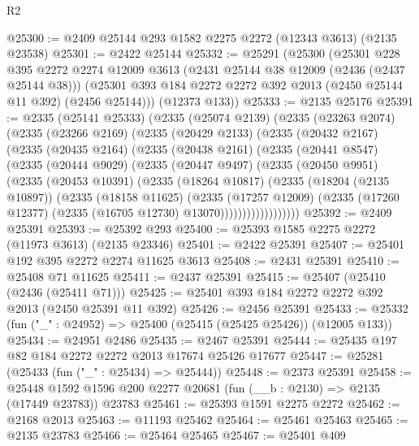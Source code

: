 \begin{lexlean}{R2}
\begin{coremodule}
@25300 := @2409 @25144 @293 @1582 @2275 @2272 (@12343 @3613) (@2135 @23538)
@25301 := @2422 @25144
@25332 := @25291
    (@25300
      (@25301
        @228
        @395
        @2272
        @2274
        @12009
        @3613
        (@2431 @25144 @38 @12009 (@2436 (@2437 @25144 @38)))
        (@25301 @393 @184 @2272 @2272 @392 @2013 (@2450 @25144 @11 @392) (@2456 @25144)))
      (@12373 @133))
@25333 := @2135 @25176
@25391 := @2335
    (@25141 @25333)
    (@2335
      (@25074 @2139)
      (@2335
        (@23263 @2074)
        (@2335
          (@23266 @2169)
          (@2335
            (@20429 @2133)
            (@2335
              (@20432 @2167)
              (@2335
                (@20435 @2164)
                (@2335
                  (@20438 @2161)
                  (@2335
                    (@20441 @8547)
                    (@2335
                      (@20444 @9029)
                      (@2335
                        (@20447 @9497)
                        (@2335
                          (@20450 @9951)
                          (@2335
                            (@20453 @10391)
                            (@2335
                              (@18264 @10817)
                              (@2335
                                (@18204 (@2135 @10897))
                                (@2335
                                  (@18158 @11625)
                                  (@2335
                                    (@17257 @12009)
                                    (@2335
                                      (@17260 @12377)
                                      (@2335 (@16705 @12730) @13070))))))))))))))))))
@25392 := @2409 @25391
@25393 := @25392 @293
@25400 := @25393 @1585 @2275 @2272 (@11973 @3613) (@2135 @23346)
@25401 := @2422 @25391
@25407 := @25401 @192 @395 @2272 @2274 @11625 @3613
@25408 := @2431 @25391
@25410 := @25408 @71 @11625
@25411 := @2437 @25391
@25415 := @25407 (@25410 (@2436 (@25411 @71)))
@25425 := @25401 @393 @184 @2272 @2272 @392 @2013 (@2450 @25391 @11 @392)
@25426 := @2456 @25391
@25433 := @25332 (fun ("_" : @24952) => @25400 (@25415 (@25425 @25426)) (@12005 @133))
@25434 := @24951 @2486
@25435 := @2467 @25391
@25444 := @25435 @197 @82 @184 @2272 @2272 @2013 @17674 @25426 @17677
@25447 := @25281 (@25433 (fun ("_" : @25434) => @25444))
@25448 := @2373 @25391
@25458 := @25448 @1592 @1596 @200 @2277 @20681 (fun (__b : @2130) => @2135 (@17449 @23783)) @23783
@25461 := @25393 @1591 @2275 @2272
@25462 := @2168 @2013
@25463 := @11193 @25462
@25464 := @25461 @25463
@25465 := @2135 @23783
@25466 := @25464 @25465
@25467 := @25401 @409

\end{coremodule}
\end{lexlean}
